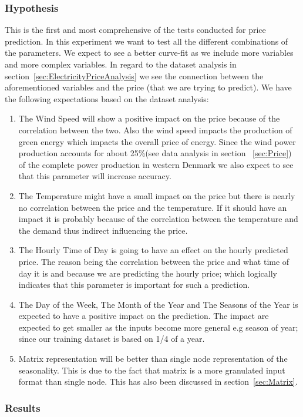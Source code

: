 \subsubsection{Hypothesis}
This is the first and most comprehensive of the tests conducted for price prediction. In this experiment we want to test all the different combinations of the parameters. We expect to see a better curve-fit as we include more variables and more complex variables. In regard to the dataset analysis in section~\ref{sec:ElectricityPriceAnalysis} we see the connection between the aforementioned variables and the price (that we are trying to predict). We have the following expectations based on the dataset analysis:
\begin{enumerate}
	\item The Wind Speed will show a positive impact on the price because of the correlation between the two. Also the wind speed impacts the production of green energy which impacts the overall price of energy. Since the wind power production accounts for about 25\%(see data analysis in section ~\ref{sec:Price}) of the complete power production in western Denmark we also expect to see that this parameter will increase accuracy.
	\item The Temperature might have a small impact on the price but there is nearly no correlation between the price and the temperature. If it should have an impact it is probably because of the correlation between the temperature and the demand thus indirect influencing the price.
	\item The Hourly Time of Day is going to have an effect on the hourly predicted price. The reason being the correlation between the price and what time of day it is and because we are predicting the hourly price; which logically indicates that this parameter is important for such a prediction. 
	\item The Day of the Week, The Month of the Year and The Seasons of the Year is expected to have a positive impact on the prediction. The impact are expected to get smaller as the inputs become more general e.g season of year; since our training dataset is based on 1/4 of a year. 
	\item Matrix representation will be better than single node representation of the seasonality. This is due to the fact that matrix is a more granulated input format than single node. This has also been discussed in section~\ref{sec:Matrix}.
\end{enumerate}

\subsubsection{Results}

